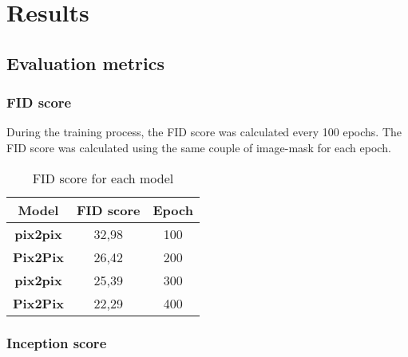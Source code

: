 \section{Results}
\label{sec:results}
\subsection{Evaluation metrics}
\subsubsection{FID score}
During the training process, the FID score was calculated every 100 epochs. 
The FID score was calculated using the same couple of image-mask for each epoch.
\begin{table}[H]
    \centering
    \begin{tabular}{|c|c|c|}
        \hline
        \textbf{Model} & \textbf{FID score} & \textbf{Epoch} \\
        \hline
        \hline
        \textbf{pix2pix} & 32,98 & 100 \\
        \hline
        \textbf{Pix2Pix} & 26,42 & 200 \\
        \hline
        \textbf{pix2pix} & 25,39 & 300 \\
        \hline
        \textbf{Pix2Pix} & 22,29 & 400 \\
    \end{tabular}
    \caption{FID score for each model}
    \label{tab:fid-score}
\end{table}
\subsubsection{Inception score}

